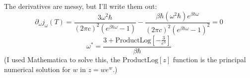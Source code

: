 \documentclass[a4paper,twoside]{article}
\begin{document}
\begin{itemize}
        \begin{problem}
            The derivatives are messy, but I'll write them out:
            \begin{equation}
                \partial_{\omega} j_{\omega}(T) = \frac{3 \omega^2 \hbar}{(2 \pi c)^2 (e^{\beta \hbar \omega} -1)} - \frac{\beta \hbar (\omega^2 \hbar) e^{\beta \hbar \omega}}{(2 \pi c)^2 (e^{\beta \hbar \omega} -1)^2} = 0
            \end{equation}
            \begin{equation}
                \omega^* = \frac{3 + \text{ProductLog}\left[ - \frac{3}{e^3} \right]}{\beta \hbar}
            \end{equation}
            (I used Mathematica to solve this, the $ \text{ProductLog}[z] $ function is the principal numerical solution for $ w $ in $ z = w e^{w} $.)
            


\end{problem}
\end{itemize}
\end{document}
